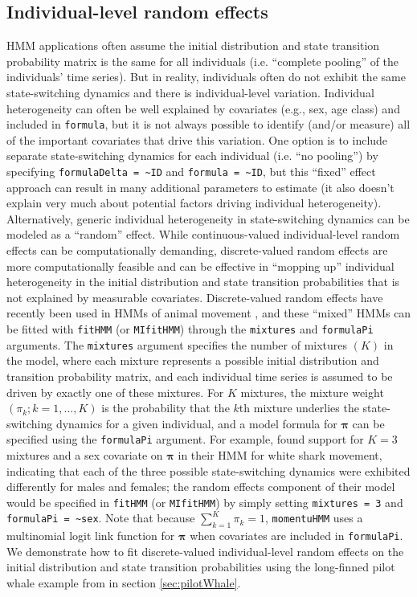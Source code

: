 \documentclass[12pt]{article}\usepackage[]{graphicx}\usepackage[]{color}
\begin{document}
\subsection{Individual-level random effects}
\label{sec:randomEffects}
HMM applications often assume the initial distribution and state transition probability matrix is the same for all individuals (i.e. ``complete pooling'' of the individuals' time series). But in reality, individuals often do not exhibit the same state-switching dynamics and there is individual-level variation.  Individual heterogeneity can often be well explained by covariates (e.g., sex, age class) and included in \verb|formula|, but it is not always possible to identify (and/or measure) all of the important covariates that drive this variation. One option is to include separate state-switching dynamics for each individual (i.e. ``no pooling'') by specifying \verb|formulaDelta = ~ID| and \verb|formula = ~ID|, but this ``fixed'' effect approach can result in many additional parameters to estimate (it also doesn't explain very much about potential factors driving individual heterogeneity). Alternatively, generic individual heterogeneity in state-switching dynamics can be modeled as a ``random'' effect. While continuous-valued individual-level random effects can be computationally demanding, discrete-valued random effects are more computationally feasible and can be effective in ``mopping up'' individual heterogeneity in the initial distribution and state transition probabilities that is not explained by measurable covariates. Discrete-valued random effects have recently been used in HMMs of animal movement \citep[e.g.][]{McKellarEtAl2014,TownerEtAl2016,DeRuiterEtAl2017,IsojunnoEtAl2017}, and these ``mixed'' HMMs can be fitted with \verb|fitHMM| (or \verb|MIfitHMM|) through the \verb|mixtures| and \verb|formulaPi| arguments.  The \verb|mixtures| argument specifies the number of mixtures $(K)$ in the model, where each mixture represents a possible initial distribution and transition probability matrix, and each individual time series is assumed to be driven by exactly one of these mixtures. For $K$ mixtures, the mixture weight $(\pi_k; k=1,\ldots,K)$ is the probability that the $k$th mixture underlies the state-switching dynamics for a given individual, and a model formula for ${\boldsymbol \pi}$ can be specified using the \verb|formulaPi| argument. For example, \cite{TownerEtAl2016} found support for $K=3$ mixtures and a sex covariate on ${\boldsymbol \pi}$ in their HMM for white shark movement, indicating that each of the three possible state-switching dynamics were exhibited differently for males and females; the random effects component of their model would be specified in \verb|fitHMM| (or \verb|MIfitHMM|) by simply setting \verb|mixtures = 3| and \verb|formulaPi = ~sex|. Note that because $\sum_{k=1}^K \pi_k = 1$, \verb|momentuHMM| uses a multinomial logit link function for ${\boldsymbol \pi}$ when covariates are included in \verb|formulaPi|. We demonstrate how to fit discrete-valued individual-level random effects on the initial distribution and state transition probabilities using the long-finned pilot whale example from \cite{IsojunnoEtAl2017} in section \ref{sec:pilotWhale}.
\end{document}
